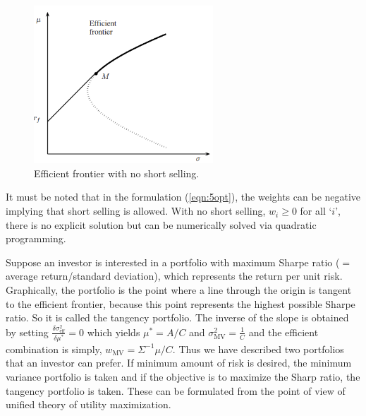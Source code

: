 	\begin{figure}[h!]
	   \centering
	   \includegraphics[width=0.6\textwidth]{chapters/chapter_apm/figures/frontier.png} 
	   \caption{Efficient frontier with no short selling. \label{fig:frontier}}
	\end{figure}
It must be noted that in the formulation (\ref{eqn:5opt}), the weights can be negative implying that short selling is allowed. With no short selling, $w_i \geq 0$ for all `$i$', there is no explicit solution but can be numerically solved via quadratic programming. 


Suppose an investor is interested in a portfolio with maximum Sharpe ratio ($=$ average return/standard deviation), which represents the return per unit risk. Graphically, the portfolio is the point where a line through the origin is tangent to the efficient frontier, because this point represents the highest possible Sharpe ratio. So it is called the tangency portfolio. The inverse of the slope is obtained by setting $\frac{\delta \sigma^2_{\text{eff}}}{\delta \mu^*}=0$ which yields $\mu^*=A/C$ and $\sigma_{\text{MV}}^2=\frac{1}{C}$ and the efficient combination is simply, $w_{\text{MV}}=\Sigma^{-1} \mu/C$. Thus we have described two portfolios that an investor can prefer. If minimum amount of risk is desired, the minimum variance portfolio is taken and if the objective is to maximize the Sharp ratio, the tangency portfolio is taken. These can be formulated from the point of view of unified theory of utility maximization. 


